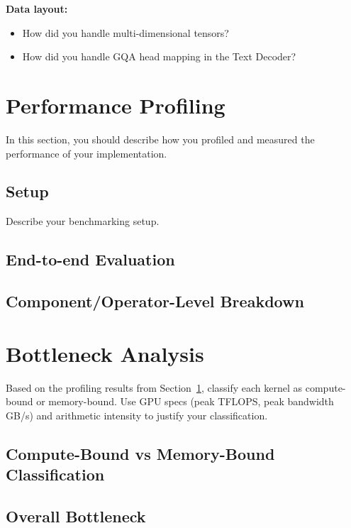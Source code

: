 \documentclass{article} %
\begin{document}
\textbf{Data layout:}
\begin{itemize}
    \item How did you handle multi-dimensional tensors?
    \item How did you handle GQA head mapping in the Text Decoder?
\end{itemize}




\section{Performance Profiling}\label{sec:profiling}

In this section, you should describe how you profiled and measured the
performance of your implementation.


\subsection{Setup}

Describe your benchmarking setup.


\subsection{End-to-end Evaluation} 


\subsection{Component/Operator-Level Breakdown}



\section{Bottleneck Analysis}\label{sec:bottleneck}

Based on the profiling results from Section~\ref{sec:profiling}, classify each kernel as compute-bound or memory-bound. Use GPU specs (peak TFLOPS, peak bandwidth GB/s) and arithmetic intensity to justify your classification.

\subsection{Compute-Bound vs Memory-Bound Classification}

\subsection{Overall Bottleneck}
\end{document}
